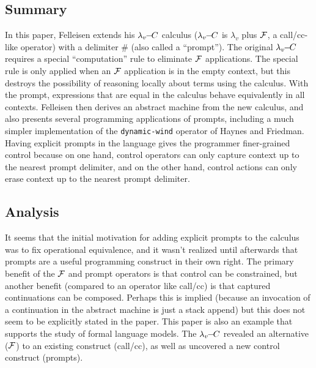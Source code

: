 \documentclass[letterpaper]{llncs}
\begin{document}

\subsection*{Summary}
In this paper, Felleisen extends his $ \lambda_v\!\!-\!\!C $ calculus ($ \lambda_v\!\!-\!\!C $ is $\lambda_v$ plus $ \mathcal{F} $, a call/cc-like operator) with a delimiter \# (also called a ``prompt''). The original $ \lambda_v\!\!-\!\!C $ requires a special ``computation'' rule to eliminate $ \mathcal{F} $ applications. The special rule is only applied when an $ \mathcal{F} $ application is in the empty context, but this destroys the possibility of reasoning locally about terms using the calculus. With the prompt, expressions that are equal in the calculus behave equivalently in all contexts. Felleisen then derives an abstract machine from the new calculus, and also presents several programming applications of prompts, including a much simpler implementation of the \texttt{dynamic-wind} operator of Haynes and Friedman. Having explicit prompts in the language gives the programmer finer-grained control because on one hand, control operators can only capture context up to the nearest prompt delimiter, and on the other hand, control actions can only erase context up to the nearest prompt delimiter.

\subsection*{Analysis}

It seems that the initial motivation for adding explicit prompts to the calculus was to fix operational equivalence, and it wasn't realized until afterwards that prompts are a useful programming construct in their own right. The primary benefit of the $ \mathcal{F} $ and prompt operators is that control can be constrained, but another benefit (compared to an operator like call/cc) is that captured continuations can be composed. Perhaps this is implied (because an invocation of a continuation in the abstract machine is just a stack append) but this does not seem to be explicitly stated in the paper. This paper is also an example that supports the study of formal language models. The $ \lambda_v\!\!-\!\!C $ revealed an alternative ($ \mathcal{F} $) to an existing construct (call/cc), as well as uncovered a new control construct (prompts).
\end{document}
